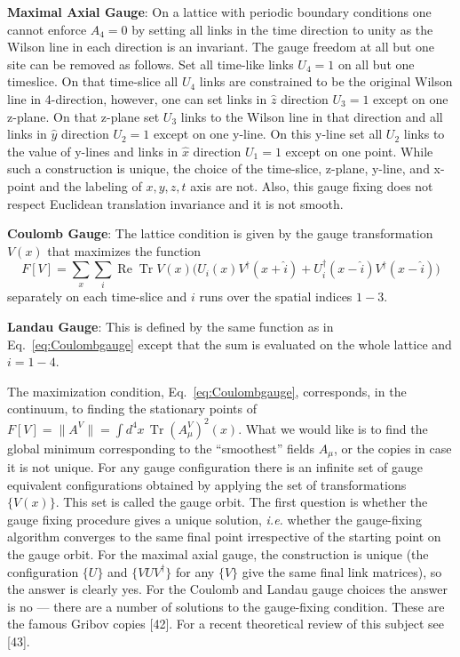 \textbf{Maximal Axial Gauge}: On a lattice with periodic boundary conditions
one cannot enforce $A_4 = 0$ by setting all links in the time direction to
unity as the Wilson line in each direction is an invariant. The gauge freedom
at all but one site can be removed as follows. Set all time-like links $U_4 =
1$ on all but one timeslice. On that time-slice all $U_4$ links are
constrained to be the original Wilson line in 4-direction, however, one can
set links in $\hat{z}$ direction $U_3 = 1$ except on one z-plane. On that
z-plane set $U_3$ links to the Wilson line in that direction and all links in
$\hat{y}$ direction $U_2 = 1$ except on one y-line. On this y-line set all
$U_2$ links to the value of y-lines and links in $\hat{x}$ direction $U_1 = 1$
except on one point. While such a construction is unique, the choice of the
time-slice, z-plane, y-line, and x-point and the labeling of $x,y,z,t$ axis
are not. Also, this gauge fixing does not respect Euclidean translation
invariance and it is not smooth.

\textbf{Coulomb Gauge}: The lattice condition is given by the gauge
transformation $V(x)$ that maximizes the function
\begin{equation}
\label{eq:Coulombgauge}
F[V] = \sum_x\sum_i \operatorname{Re}\operatorname{Tr} V(x)
\bigg( U_i(x)V^\dagger(x+\hat{i}) +
       U_i^\dagger(x-\hat{i})V^\dagger(x-\hat{i}) \bigg)
\end{equation}
separately on each time-slice and $i$ runs over the spatial indices $1-3$.

\textbf{Landau Gauge}: This is defined by the same function as in
Eq.~\ref{eq:Coulombgauge} except that the sum is evaluated on the whole
lattice and $i = 1-4$.

The maximization condition, Eq.~\ref{eq:Coulombgauge}, corresponds, in the
continuum, to finding the stationary points of $F[V] = \lVert A^V \rVert =
\int d^4x\, \operatorname{Tr}(A_\mu^V)^2(x)$. What we would like is to find
the global minimum corresponding to the ``smoothest'' fields $A_\mu$, or the
copies in case it is not unique. For any gauge configuration there is an
infinite set of gauge equivalent configurations obtained by applying the set
of transformations $\{V(x)\}$. This set is called the gauge orbit. The first
question is whether the gauge fixing procedure gives a unique solution,
\textit{i.e.} whether the gauge-fixing algorithm converges to the same final
point irrespective of the starting point on the gauge orbit. For the maximal
axial gauge, the construction is unique (the configuration $\{U\}$ and
$\{VUV^\dagger\}$ for any $\{V\}$ give the same final link matrices), so the
answer is clearly yes. For the Coulomb and Landau gauge choices the answer is
no --- there are a number of solutions to the gauge-fixing condition. These
are the famous Gribov copies [42]. For a recent theoretical review of this
subject see [43].

